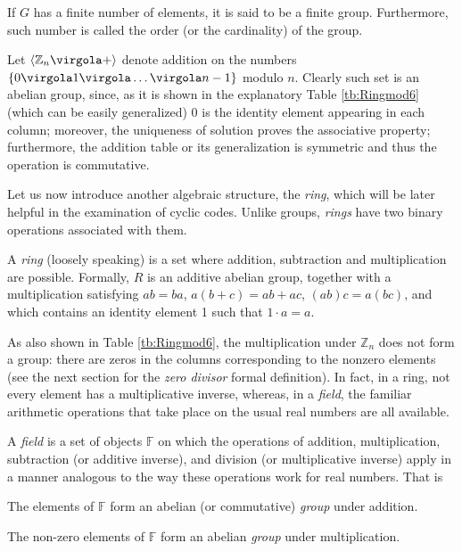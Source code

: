 \begin{Def}
If $G$ has a finite number of elements, it is said to be a finite group. Furthermore, such number is called the order (or the cardinality) of the group.
\end{Def}

Let \( \langle \mathbb Z_n \virgola + \rangle \) denote addition on the numbers \( \{0 \virgola 1 \virgola \ldots \virgola n-1 \}\) modulo $n$. Clearly such set is an abelian group, since, as it is shown in the explanatory Table \ref{tb:Ringmod6} (which can be easily generalized) 0 is the identity element appearing in each column; moreover, the uniqueness of solution proves the associative property; furthermore, the addition table or its generalization is symmetric and thus the operation is commutative.

Let us now introduce another algebraic structure, the \emph{ring}, which will be later helpful in the examination of cyclic codes. Unlike groups, \emph{rings} have two binary operations associated with them.
\begin{Def}
A \emph{ring} (loosely speaking) is a set where addition, subtraction and multiplication are possible. Formally, \(R\) is an additive abelian group, together with a multiplication satisfying \(ab=ba\), \(a(b+c)=ab+ac\), \((ab)c = a(bc)\), and which contains an identity element 1 such that \(1\cdot a=a\).
\end{Def}
As also shown in Table \ref{tb:Ringmod6}, the multiplication under \( \mathbb Z_{n}\) does not form a group: there are zeros in the columns corresponding to the nonzero elements (see the next section for the \emph{zero divisor} formal definition). In fact, in a ring, not every element has a multiplicative inverse, whereas, in a \emph{field}, the familiar arithmetic operations that take place on the usual real numbers are all available.

\begin{Def}
A \emph{field} is a set of objects \( \mathbb F\) on which the operations of addition, multiplication, subtraction (or additive inverse), and division (or multiplicative inverse) apply in a manner analogous to the way these operations work for real numbers. That is
\itemize
\item[F1]  The elements of \( \mathbb F \) form an abelian (or commutative) \emph{group} under addition.
\item[F2] The non-zero elements of \( \mathbb F\) form an abelian \emph{group} under multiplication.
\end{Def}

